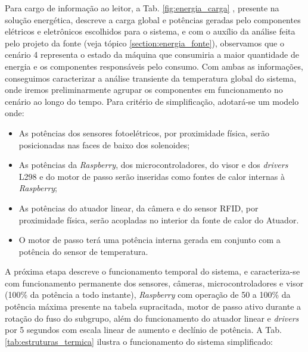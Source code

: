 Para cargo de informação ao leitor, a Tab. \ref{fig:energia_carga} , presente na solução energética, descreve a carga global e potências geradas pelo componentes elétricos e eletrônicos escolhidos para o sistema, e com o auxílio da análise feita pelo projeto da fonte (veja tópico \ref{section:energia_fonte}), observamos que o cenário 4 representa o estado da máquina que consumiria a maior quantidade de energia e os componentes responsáveis pelo consumo. Com ambas as informações, conseguimos caracterizar a análise transiente da temperatura global do sistema, onde iremos preliminarmente agrupar os componentes em funcionamento no cenário ao longo do tempo. Para critério de simplificação, adotará-se um modelo onde:
\begin{itemize}
    \item As potências dos sensores fotoelétricos, por proximidade física, serão posicionadas nas faces de baixo dos solenoides;
    \item As potências da \textit{Raspberry}, dos microcontroladores, do visor e dos \textit{drivers} L298 e do motor de passo serão inseridas como fontes de calor internas à \textit{Raspberry};
    \item As potências do atuador linear, da câmera e do sensor RFID, por proximidade física, serão acopladas no interior da fonte de calor do Atuador. 
    \item O motor de passo terá uma potência interna gerada em conjunto com a potência do sensor de temperatura.
\end{itemize}

A próxima etapa descreve o funcionamento temporal do sistema, e caracteriza-se com funcionamento permanente dos sensores, câmeras, microcontroladores e visor (100\% da potência a todo instante), \textit{Raspberry} com operação de 50 a 100\% da potência máxima presente na tabela supracitada, motor de passo ativo durante a rotação do fuso do subgrupo, além do funcionamento do atuador linear e \textit{drivers} por 5 segundos com escala linear de aumento e declínio de potência. A Tab. \ref{tab:estruturas_termica} ilustra o funcionamento do sistema simplificado:

